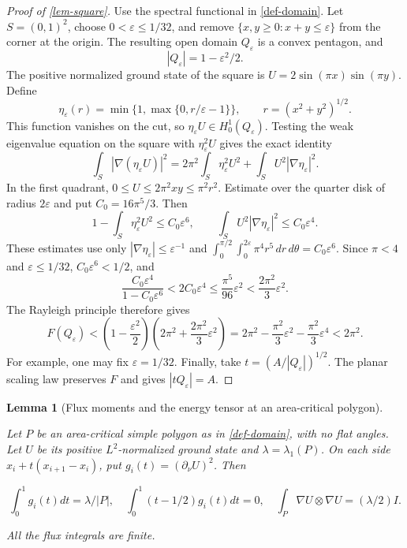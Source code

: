 \documentclass[11pt,a4paper]{article}
\theoremstyle{proofmanuscript}
\newtheorem{lemma}[theorem]{Lemma}
\begin{document}
\begin{proof}[Proof of \ref{lem-square}]

Use the spectral functional in \ref{def-domain}. Let \(S=(0,1)^2\), choose \(0<\varepsilon\le1/32\), and remove \(\{x,y\ge0:x+y\le\varepsilon\}\) from the corner at the origin. The resulting open domain \(Q_\varepsilon\) is a convex pentagon, and \[
|Q_\varepsilon|=1-\varepsilon^2/2.
\] The positive normalized ground state of the square is \(U=2\sin(\pi x)\sin(\pi y)\). Define \[
\eta_\varepsilon(r)=\min\{1,\max\{0,r/\varepsilon-1\}\},\qquad
r=(x^2+y^2)^{1/2}.
\] This function vanishes on the cut, so \(\eta_\varepsilon U\in H_0^1(Q_\varepsilon)\). Testing the weak eigenvalue equation on the square with \(\eta_\varepsilon^2U\) gives the exact identity \[
\int_S|\nabla(\eta_\varepsilon U)|^2
=2\pi^2\int_S\eta_\varepsilon^2U^2
+\int_SU^2|\nabla\eta_\varepsilon|^2.
\] In the first quadrant, \(0\le U\le2\pi^2xy\le\pi^2r^2\). Estimate over the quarter disk of radius \(2\varepsilon\) and put \(C_0=16\pi^5/3\). Then \[
1-\int_S\eta_\varepsilon^2U^2\le C_0\varepsilon^6,
\qquad
\int_SU^2|\nabla\eta_\varepsilon|^2\le C_0\varepsilon^4.
\] These estimates use only \(|\nabla\eta_\varepsilon|\le\varepsilon^{-1}\) and \(\int_0^{\pi/2}\int_0^{2\varepsilon}\pi^4r^5\,dr\,d\theta =C_0\varepsilon^6\). Since \(\pi<4\) and \(\varepsilon\le1/32\), \(C_0\varepsilon^6<1/2\), and \[
\frac{C_0\varepsilon^4}{1-C_0\varepsilon^6}
<2C_0\varepsilon^4
\le\frac{\pi^5}{96}\varepsilon^2
<\frac{2\pi^2}{3}\varepsilon^2.
\] The Rayleigh principle therefore gives \[
F(Q_\varepsilon)
<\left(1-\frac{\varepsilon^2}{2}\right)
 \left(2\pi^2+\frac{2\pi^2}{3}\varepsilon^2\right)
=2\pi^2-\frac{\pi^2}{3}\varepsilon^2
 -\frac{\pi^2}{3}\varepsilon^4
<2\pi^2.
\] For example, one may fix \(\varepsilon=1/32\). Finally, take \(t=(A/|Q_\varepsilon|)^{1/2}\). The planar scaling law preserves \(F\) and gives \(|tQ_\varepsilon|=A\).

\end{proof}

\begin{lemma}[Flux moments and the energy tensor at an area-critical polygon]\label{lem-variations}

Let \(P\) be an area-critical simple polygon as in \ref{def-domain}, with no flat angles. Let \(U\) be its positive \(L^2\)-normalized ground state and \(\lambda=\lambda_1(P)\). On each side \(x_i+t(x_{i+1}-x_i)\), put \(g_i(t)=(\partial_\nu U)^2\). Then

\[
\int_0^1g_i(t)dt=\lambda/|P|,\quad \int_0^1(t-1/2)g_i(t)dt=0,\quad \int_P\nabla U\otimes\nabla U=(\lambda/2)I.\tag{G.2.1}
\]

All the flux integrals are finite.

\end{lemma}
\end{document}
